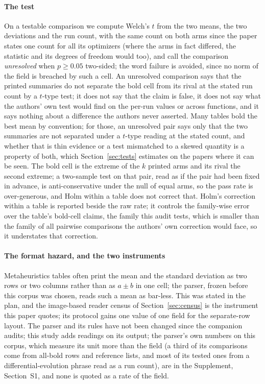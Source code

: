 \documentclass[preprint,review,12pt]{elsarticle}
\begin{document}
\paragraph{The test} On a testable comparison we compute Welch's $t$ \cite{welch1947generalization} from the two means, the two deviations and the run count, with the same count on both arms since the paper states one count for all its optimizers (where the arms in fact differed, the statistic and its degrees of freedom would too), and call the comparison \emph{unresolved} when $p \geq 0.05$ two-sided; the word failure is avoided, since no norm of the field is breached by such a cell. An unresolved comparison says that the printed summaries do not separate the bold cell from its rival at the stated run count by a $t$-type test; it does not say that the claim is false, it does not say what the authors' own test would find on the per-run values or across functions, and it says nothing about a difference the authors never asserted. Many tables bold the best mean by convention; for those, an unresolved pair says only that the two summaries are not separated under a $t$-type reading at the stated count, and whether that is thin evidence or a test mismatched to a skewed quantity is a property of both, which Section~\ref{sec:tests} estimates on the papers where it can be seen. The bold cell is the extreme of the $k$ printed arms and its rival the second extreme; a two-sample test on that pair, read as if the pair had been fixed in advance, is anti-conservative under the null of equal arms, so the pass rate is over-generous, and Holm within a table does not correct that. Holm's correction \cite{holm1979simple} within a table is reported beside the raw rate; it controls the family-wise error over the table's bold-cell claims, the family this audit tests, which is smaller than the family of all pairwise comparisons the authors' own correction would face, so it understates that correction.

\paragraph{The format hazard, and the two instruments} Metaheuristics tables often print the mean and the standard deviation as two rows or two columns rather than as $a \pm b$ in one cell; the parser, frozen before this corpus was chosen, reads such a mean as bar-less. This was stated in the plan, and the image-based reader census of Section~\ref{sec:census} is the instrument this paper quotes; its protocol gains one value of one field for the separate-row layout. The parser and its rules have not been changed since the companion audits; this study adds readings on its output; the parser's own numbers on this corpus, which measure its unit more than the field (a third of its comparisons come from all-bold rows and reference lists, and most of its tested ones from a differential-evolution phrase read as a run count), are in the Supplement, Section~S1, and none is quoted as a rate of the field.
\end{document}
